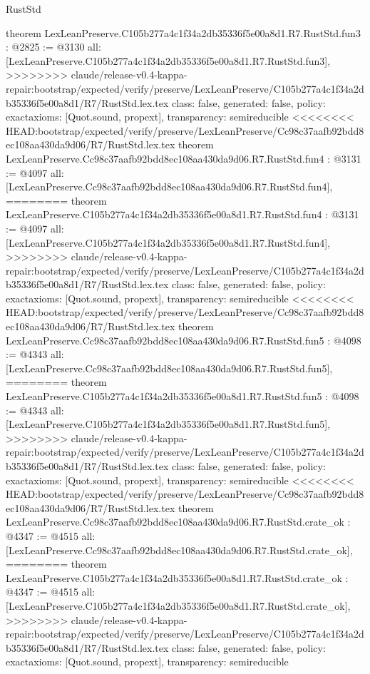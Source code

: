 \begin{lexlean}{RustStd}
\begin{coremodule}
{\begin{coremodule}
{{{{{{theorem LexLeanPreserve.C105b277a4c1f34a2db35336f5e00a8d1.R7.RustStd.fun3 : @2825 := @3130 {
  all: [LexLeanPreserve.C105b277a4c1f34a2db35336f5e00a8d1.R7.RustStd.fun3],
>>>>>>>> claude/release-v0.4-kappa-repair:bootstrap/expected/verify/preserve/LexLeanPreserve/C105b277a4c1f34a2db35336f5e00a8d1/R7/RustStd.lex.tex
  class: false,
  generated: false,
  policy: exact{axioms: [Quot.sound, propext]},
  transparency: semireducible
}
<<<<<<<< HEAD:bootstrap/expected/verify/preserve/LexLeanPreserve/Cc98c37aafb92bdd8ec108aa430da9d06/R7/RustStd.lex.tex
theorem LexLeanPreserve.Cc98c37aafb92bdd8ec108aa430da9d06.R7.RustStd.fun4 : @3131 := @4097 {
  all: [LexLeanPreserve.Cc98c37aafb92bdd8ec108aa430da9d06.R7.RustStd.fun4],
========
theorem LexLeanPreserve.C105b277a4c1f34a2db35336f5e00a8d1.R7.RustStd.fun4 : @3131 := @4097 {
  all: [LexLeanPreserve.C105b277a4c1f34a2db35336f5e00a8d1.R7.RustStd.fun4],
>>>>>>>> claude/release-v0.4-kappa-repair:bootstrap/expected/verify/preserve/LexLeanPreserve/C105b277a4c1f34a2db35336f5e00a8d1/R7/RustStd.lex.tex
  class: false,
  generated: false,
  policy: exact{axioms: [Quot.sound, propext]},
  transparency: semireducible
}
<<<<<<<< HEAD:bootstrap/expected/verify/preserve/LexLeanPreserve/Cc98c37aafb92bdd8ec108aa430da9d06/R7/RustStd.lex.tex
theorem LexLeanPreserve.Cc98c37aafb92bdd8ec108aa430da9d06.R7.RustStd.fun5 : @4098 := @4343 {
  all: [LexLeanPreserve.Cc98c37aafb92bdd8ec108aa430da9d06.R7.RustStd.fun5],
========
theorem LexLeanPreserve.C105b277a4c1f34a2db35336f5e00a8d1.R7.RustStd.fun5 : @4098 := @4343 {
  all: [LexLeanPreserve.C105b277a4c1f34a2db35336f5e00a8d1.R7.RustStd.fun5],
>>>>>>>> claude/release-v0.4-kappa-repair:bootstrap/expected/verify/preserve/LexLeanPreserve/C105b277a4c1f34a2db35336f5e00a8d1/R7/RustStd.lex.tex
  class: false,
  generated: false,
  policy: exact{axioms: [Quot.sound, propext]},
  transparency: semireducible
}
<<<<<<<< HEAD:bootstrap/expected/verify/preserve/LexLeanPreserve/Cc98c37aafb92bdd8ec108aa430da9d06/R7/RustStd.lex.tex
theorem LexLeanPreserve.Cc98c37aafb92bdd8ec108aa430da9d06.R7.RustStd.crate_ok : @4347 := @4515 {
  all: [LexLeanPreserve.Cc98c37aafb92bdd8ec108aa430da9d06.R7.RustStd.crate_ok],
========
theorem LexLeanPreserve.C105b277a4c1f34a2db35336f5e00a8d1.R7.RustStd.crate_ok : @4347 := @4515 {
  all: [LexLeanPreserve.C105b277a4c1f34a2db35336f5e00a8d1.R7.RustStd.crate_ok],
>>>>>>>> claude/release-v0.4-kappa-repair:bootstrap/expected/verify/preserve/LexLeanPreserve/C105b277a4c1f34a2db35336f5e00a8d1/R7/RustStd.lex.tex
  class: false,
  generated: false,
  policy: exact{axioms: [Quot.sound, propext]},
  transparency: semireducible
}}}}}}}}}}
\end{coremodule}}
\end{coremodule}
\end{lexlean}
